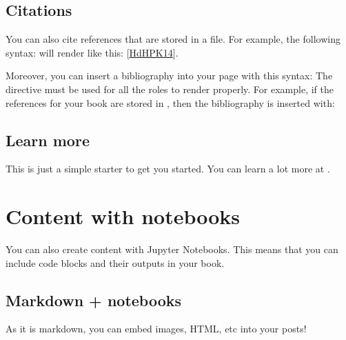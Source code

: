 \documentclass[letterpaper,10pt,english]{jupyterBook}
\begin{document}
\subsection{Citations}
\label{\detokenize{src/test/markdown:citations}}
\sphinxAtStartPar
You can also cite references that are stored in a  file. For example,
the following syntax:  will render like
this: {[}\hyperlink{cite.src/test/markdown:id3}{HdHPK14}{]}.

\sphinxAtStartPar
Moreover, you can insert a bibliography into your page with this syntax:
The  directive must be used for all the  roles to
render properly.
For example, if the references for your book are stored in ,
then the bibliography is inserted with:


\subsection{Learn more}
\label{\detokenize{src/test/markdown:learn-more}}
\sphinxAtStartPar
This is just a simple starter to get you started.
You can learn a lot more at .

\sphinxstepscope


\section{Content with notebooks}
\label{\detokenize{src/test/notebooks:content-with-notebooks}}\label{\detokenize{src/test/notebooks::doc}}
\sphinxAtStartPar
You can also create content with Jupyter Notebooks. This means that you can include
code blocks and their outputs in your book.


\subsection{Markdown + notebooks}
\label{\detokenize{src/test/notebooks:markdown-notebooks}}
\sphinxAtStartPar
As it is markdown, you can embed images, HTML, etc into your posts!

\sphinxAtStartPar
{}
\end{document}
